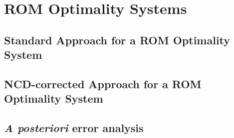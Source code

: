 \section{ROM Optimality Systems}

\subsection{Standard Approach for a ROM Optimality System}


\subsection{NCD-corrected Approach for a ROM Optimality System}


\subsection{\textit{A posteriori} error analysis}

